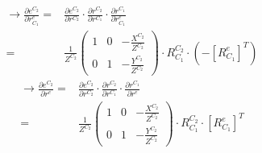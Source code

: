 \documentclass[12pt, twocolumn]{article}
\begin{document}
	\begin{equation*}
		\begin{aligned}
			\to\frac{\partial e^{C_2}}{\partial r_{C_1}^e}=&
			\frac{\partial e^{C_2}}{\partial r^{C_2}}\cdot	
			\frac{\partial r^{C_2}}{\partial  r^{C_1}}\cdot		\frac{\partial r^{C_1}}{\partial r_{C_1}^e}\\=&
			\frac{1}{Z^{C_2}}\begin{pmatrix}
				1&0&-\frac{X^{C_2}}{Z^{C_2}}\\
				0&1&-\frac{Y^{C_2}}{Z^{C_2}}
			\end{pmatrix}\cdot R_{C_1}^{C_2}\cdot
			(-[R_{C_1}^e]^T)
		\end{aligned}
	\end{equation*}
	\begin{equation*}
	\begin{aligned}
		\to\frac{\partial e^{C_2}}{\partial r^e}=&
		\frac{\partial e^{C_2}}{\partial r^{C_2}}\cdot	
		\frac{\partial r^{C_2}}{\partial  r^{C_1}}\cdot		\frac{\partial r^{C_1}}{\partial r^e}\\=&
		\frac{1}{Z^{C_2}}\begin{pmatrix}
			1&0&-\frac{X^{C_2}}{Z^{C_2}}\\
			0&1&-\frac{Y^{C_2}}{Z^{C_2}}
		\end{pmatrix}\cdot R_{C_1}^{C_2}\cdot
		[R_{C_1}^e]^T
	\end{aligned}
\end{equation*}
\end{document}
